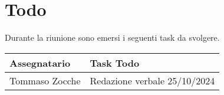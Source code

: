  \section{Todo}
 Durante la riunione sono emersi i seguenti task da svolgere.

 \begin{center}
   \begin{tabular}{|p{5cm}|p{8cm}|}
     \hline
     \textbf{Assegnatario}       & \textbf{Task Todo} \\ \hline
       Tommaso Zocche  &  Redazione verbale 25/10/2024 \\ \hline
   \end{tabular}
 \end{center}